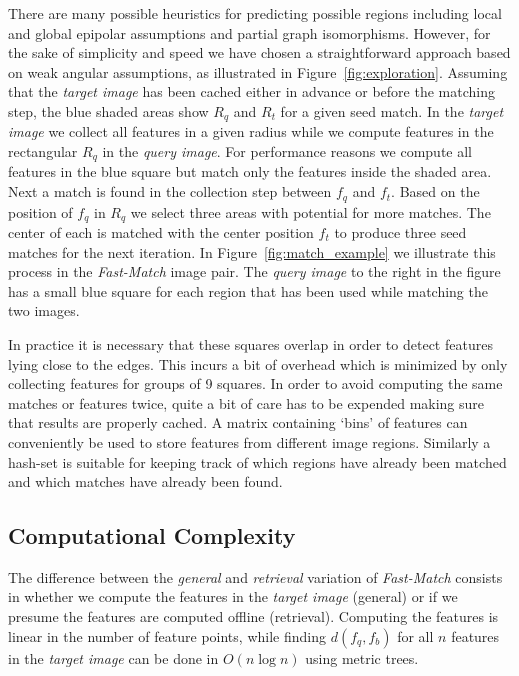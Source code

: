 \documentclass[runningheads]{llncs}
\begin{document}
There are many possible heuristics for predicting possible regions including local and global epipolar assumptions and partial graph isomorphisms. However, for the sake of simplicity and speed we have chosen a straightforward approach based on weak angular assumptions, as illustrated in Figure~\ref{fig:exploration}. Assuming that the \emph{target image} has been cached either in advance or before the matching step, the blue shaded areas show $R_q$ and $R_t$ for a given seed match. In the \emph{target image} we collect all features in a given radius while we compute features in the rectangular $R_q$ in the \emph{query image}. For performance reasons we compute all features in the blue square but match only the features inside the shaded area. Next a match is found in the collection step between $f_q$ and $f_t$. Based on the position of $f_q$ in $R_q$ we select three areas with potential for more matches. The center of each is matched with the center position $f_t$ to produce three seed matches for the next iteration. In Figure~\ref{fig:match_example} we illustrate this process in the \emph{Fast-Match} image pair. The \emph{query image} to the right in the figure has a small blue square for each region that has been used while matching the two images.

In practice it is necessary that these squares overlap in order to detect features lying close to the edges. This incurs a bit of overhead which is minimized by only collecting features for groups of 9 squares. In order to avoid computing the same matches or features twice, quite a bit of care has to be expended making sure that results are properly cached. A matrix containing `bins' of features can conveniently be used to store features from different image regions. Similarly a hash-set is suitable for keeping track of which regions have already been matched and which matches have already been found.

\subsection{Computational Complexity}
\label{complexity}
%
The difference between the \emph{general} and \emph{retrieval} variation of \emph{Fast-Match} consists in whether we compute the features in the \emph{target image} (general) or if we presume the features are computed offline (retrieval). Computing the features is linear in the number of feature points, while finding $d(f_q, f_b)$ for all $n$ features in the \emph{target image} can be done in $O(n\log n)$ using metric trees. 
\end{document}
